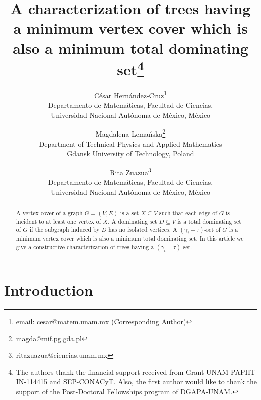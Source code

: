 \documentclass[12pt]{article}%
\theoremstyle{definition}
\begin{document}
\title{A characterization of trees having a minimum vertex cover which is also a minimum total dominating set\thanks{The authors thank the financial support received from
Grant UNAM-PAPIIT IN-114415 and SEP-CONACyT.
Also, the first author would like to thank the support of
the Post-Doctoral Fellowships program of DGAPA-UNAM.}}

\author{C\'esar Hern\'andez-Cruz\thanks{email: cesar@matem.unam.mx (Corresponding Author)} \\ {\small Departamento de Matem\'aticas, Facultad de Ciencias, \\ Universidad Nacional Aut\'onoma de M\'exico, M\'exico} \and Magdalena Lema\'nska\thanks{magda@mif.pg.gda.pl} \\ {\small Department of Technical Physics and Applied Mathematics \\ Gdansk University of
Technology, Poland} \and  Rita Zuazua\thanks{ritazuazua@ciencias.unam.mx} \\ {\small Departamento de Matem\'aticas, Facultad de Ciencias, \\ Universidad Nacional Aut\'onoma de M\'exico, M\'exico}
}

\maketitle
\begin{abstract}
A vertex cover of a graph $G = (V, E)$ is a set
$X \subseteq V$ such that each edge of $G$ is
incident to at least one vertex of $X$. A dominating
set $D \subseteq V$ is a total dominating set of $G$
if the subgraph induced by $D$ has no isolated
vertices. A $(\gamma_t-\tau)$-set of $G$ is a minimum
vertex cover which is also a minimum total dominating
set. In this article we give a constructive characterization
of trees having a $(\gamma_t-\tau)$-set.
\end{abstract}


\section{Introduction}
\label{sec:intro}
\end{document}
